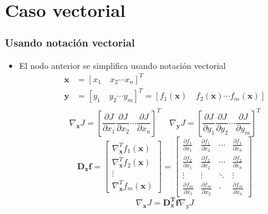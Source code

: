 \documentclass{beamer}
\begin{document}
\section{Caso vectorial}
\begin{frame}
\frametitle{Usando notación vectorial}
\begin{itemize}
\item El nodo anterior se simplifica usando notación vectorial  
\begin{align*} 
\boldsymbol{x} &= [x_1 \quad x_2 \cdots x_n]^T \\
\boldsymbol{y} &= [y_1 \quad y_2 \cdots y_m]^T = [f_1(\boldsymbol{x}) \quad f_2(\boldsymbol{x}) \cdots f_m(\boldsymbol{x})] \\
\end{align*}
\begin{equation*}
\nabla_{\boldsymbol{x}} J = \left[ \frac{\partial J}{\partial x_1}  \frac{\partial J}{\partial x_2} \cdots \frac{\partial J}{\partial x_n}   \right]^T  \quad \nabla_{\boldsymbol{y}} J= \left[ \frac{\partial J}{\partial y_1}  \frac{\partial J}{\partial y_2} \cdots \frac{\partial J}{\partial y_m}   \right]^T 
\end{equation*}
\begin{equation*}
\boldsymbol{D_xf}= 
\begin{bmatrix}
\nabla_{\boldsymbol{x}}^T f_1(\boldsymbol{x})\\
\nabla_{\boldsymbol{x}}^T f_2(\boldsymbol{x})\\
\vdots \\
\nabla_{\boldsymbol{x}}^T f_m(\boldsymbol{x})
\end{bmatrix}
= 
\begin{bmatrix}
\frac{\partial f_1}{\partial x_1} & \frac{\partial f_1}{\partial x_2} & \cdots & \frac{\partial f_1}{\partial x_n} \\
\frac{\partial f_2}{\partial x_1} & \frac{\partial f_2}{\partial x_2} & \cdots & \frac{\partial f_2}{\partial x_n}\\
\vdots &  \vdots & \ddots & \vdots \\
\frac{\partial f_m}{\partial x_1} & \frac{\partial f_m}{\partial x_2} & \cdot & \frac{\partial f_m}{\partial x_n}
\end{bmatrix}
\end{equation*}
\begin{equation*}
\nabla_{\boldsymbol{x}} J= \boldsymbol{D_x^T f} \nabla_{y} J
\end{equation*}
\end{itemize}
\end{frame}
\end{document}
